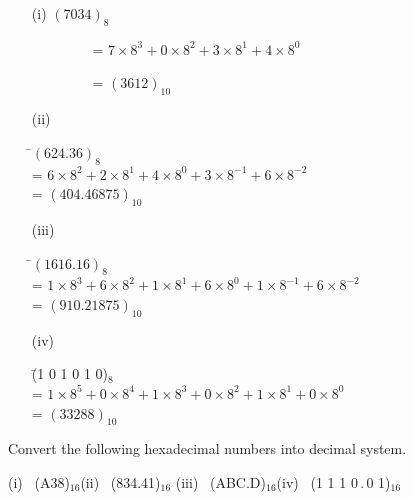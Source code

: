 \begin{solution}
\begin{itemize}
\item[(i)] $(7034)_{8}$

\qquad~~~~~~~~ = $7\times 8^{3}+0\times 8^{2}+3\times 8^{1}+4\times 8^{0}$

\qquad~~~~~~~~ = $(3612)_{10}$

\item[(ii)] 
\begin{tabbing}
\=$(624.36)_{8}$\\[4pt]
\>= $6\times 8^{2}+2\times 8^{1}+4\times 8^{0}+3\times 8^{-1}+6\times 8^{-2}$\\[4pt]
\>= $(404.46875)_{10}$
\end{tabbing}

\item[(iii)]
\begin{tabbing}
\=$(1616.16)_{8}$\\[4pt]
\>= $1\times 8^{3}+6\times 8^{2}+1\times 8^{1}+6\times 8^{0}+1\times 8^{-1}+6\times 8^{-2}$\\[4pt]
\>= $(910.21875)_{10}$
\end{tabbing}

\item[(iv)]
\begin{tabbing}
\=(1 0 1 0 1 0)$_{8}$\\[4pt]
\>= $1\times 8^{5}+0\times 8^{4}+1\times 8^{3}+0\times 8^{2}+1\times 8^{1}+0\times 8^{0}$\\[4pt]
\>= $(33288)_{10}$
\end{tabbing}
\end{itemize}
\end{solution}

\begin{problem}\label{prob5.3}
Convert the following hexadecimal numbers into decimal system.

\medskip
(i)~ (A38)$_{16}$\hfil (ii)~  (834.41)$_{16}$\hfil
(iii)~ (ABC.D)$_{16}$\hfil (iv)~ (1 1 1 0\,.\,0 1)$_{16}$
\end{problem}

\eject


